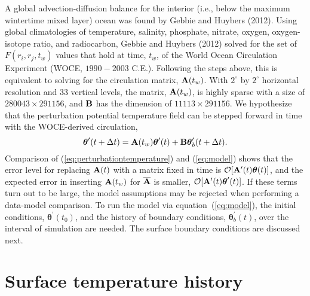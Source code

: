 \documentclass[12pt]{article}
\begin{document}
A global advection-diffusion balance for the interior (i.e., below the maximum wintertime mixed layer) ocean was found by Gebbie and Huybers (2012).
Using global climatologies of temperature, salinity, phosphate, nitrate, oxygen, oxygen-isotope ratio, and radiocarbon, Gebbie and Huybers (2012) solved for the set of $F(r_i,r_j,t_w)$ values that hold at time, $t_w$, of the World Ocean Circulation Experiment (WOCE, $1990-2003$ C.E.). Following the steps above, this is equivalent to solving for the circulation matrix, ${\bf A}(t_w)$.
With $2^{\circ}$ by $2^{\circ}$ horizontal resolution and 33 vertical levels, the matrix, ${\bf A}(t_w)$, is highly sparse with a
size of $280043 \times 291156$, and ${\bf B}$ has the dimension of $11113 \times 291156$.
We hypothesize that the perturbation potential temperature field can be stepped forward in time with the WOCE-derived circulation, \begin{equation}
\label{eq:model}
{\boldsymbol \theta}^\prime(t+ \Delta t) = {\bf A}(t_w) {\boldsymbol \theta}^\prime(t) + {\bf B} {\boldsymbol  \theta}^\prime_{b}(t+\Delta t).
\end{equation}
Comparison of (\ref{eq:perturbationtemperature}) and (\ref{eq:model}) shows that the error level for replacing ${\bf A}(t)$ with a matrix fixed in time is ${\cal O}[{\bf A}^\prime(t){\boldsymbol \theta(t)}]$, and the expected error in inserting ${\bf A}(t_w)$ for ${\overline {\bf A}}$ is smaller,  ${\cal O}[{\bf A}^\prime(t){\boldsymbol \theta^\prime(t)}]$. If these terms turn out to be large, the model assumptions may be rejected when performing a data-model comparison. To run the model via equation~(\ref{eq:model}), the initial conditions, ${\boldsymbol \theta}^\prime(t_0)$, and the history of boundary conditions, ${\boldsymbol \theta}^\prime_b(t)$, over the interval of simulation are needed. The surface boundary conditions are discussed next.

\section{Surface temperature history}
\end{document}
